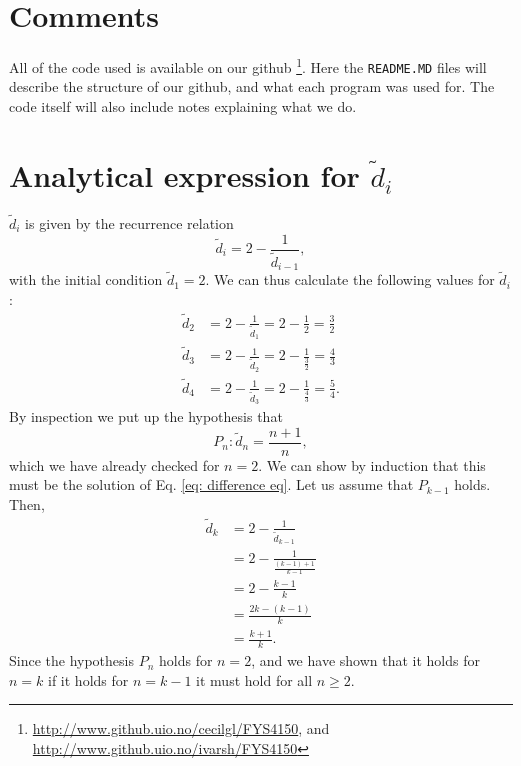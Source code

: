 \documentclass[%
 reprint,
nofootinbib,
 amsmath,amssymb,
 aps,
]{revtex4-1}
\begin{document}
\section{Comments}
All of the code used is available on our github \footnote{\url{http://www.github.uio.no/cecilgl/FYS4150}, and \url{http://www.github.uio.no/ivarsh/FYS4150}}. Here the \texttt{README.MD} files will describe the structure of our github, and what each program was used for. The code itself will also include notes explaining what we do.

\appendix

\section{Analytical expression for $\tilde{d}_i$}\label{appendix_1}

$\tilde{d}_i$ is given by the recurrence relation
\begin{equation}\label{eq: difference eq}
\tilde{d}_i = 2 - \frac{1}{\tilde{d}_{i-1}},
\end{equation}
with the initial condition $\tilde{d}_1 = 2$. We can thus calculate the following values for $\tilde{d}_i$:
\begin{align*}
\tilde{d}_2 &= 2 - \frac{1}{\tilde{d}_{1}} = 2 - \frac{1}{2} = \frac{3}{2}\\
\tilde{d}_3 &= 2 - \frac{1}{\tilde{d}_{2}} = 2 - \frac{1}{\frac{3}{2}} = \frac{4}{3}\\
\tilde{d}_4 &= 2 - \frac{1}{\tilde{d}_{3}} = 2 - \frac{1}{\frac{4}{3}} = \frac{5}{4}.
\end{align*}
By inspection we put up the hypothesis that
\begin{equation}
P_n:  \tilde{d}_n = \frac{n+1}{n},
\end{equation}
which we have already checked for $n = 2$. We can show by induction that this must be the solution of Eq. \eqref{eq: difference eq}. Let us assume that  $P_{k-1}$ holds. Then,
\begin{align*}
\tilde{d}_k &= 2 - \frac{1}{\tilde{d}_{k-1}}\\
&= 2 - \frac{1}{\frac{(k-1)+1}{k-1}}\\
&= 2 - \frac{k-1}{k}\\
&= \frac{2k - (k-1)}{k}\\
&= \frac{k+1}{k}.
\end{align*}
Since the hypothesis $P_n$ holds for $n = 2$, and we have shown that it holds for $n = k$ if it holds for $n = k-1$ it must hold for all $n \geq 2$.

{}

\end{document}
